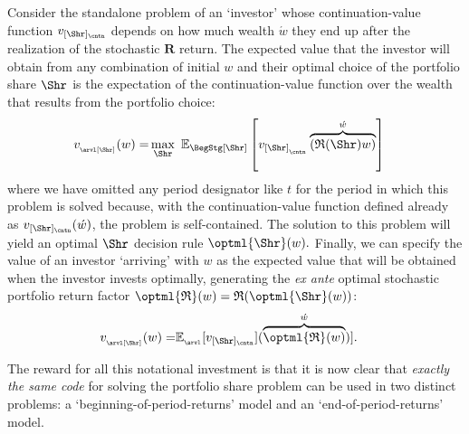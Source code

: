 \documentclass[titlepage, headings=optiontotocandhead]{Resources/texmf-local/tex/latex/econtex}
\begin{document}
Consider the standalone problem of an `investor' whose continuation-value function $v_{[\Shr]_\cntn}$ depends on how much wealth $\acute{w}$ they end up after the realization of the stochastic ${\mathbf{R}}$ return.  The expected value that the investor will obtain from any combination of initial $w$ and their optimal choice of the portfolio share $\Shr$ is the expectation of the continuation-value function over the wealth that results from the portfolio choice:
\begin{equation}\begin{gathered}\begin{aligned}
  v_{_\arvl[\Shr]}(w)  = & \max_{\Shr}~ {\mathbb{E}}_{\BegStg[\Shr]}\left[v_{[\Shr]_{_\cntn}}\overbrace{\left(\mathfrak{R}(\Shr){w}\right)}^{\acute{w}}\right] \label{eq:vMidStgShr}
    \end{aligned}\end{gathered}\end{equation}
where we have omitted any {period} designator like $t$ for the {period} in which this problem is solved because, with the continuation-value function defined already as $v_{[\Shr]_\cntn}(\acute{w})$, the problem is self-contained.  The solution to this problem will yield an optimal $\Shr$ decision rule $\optml{\Shr}(w).$  Finally, we can specify the value of an investor `arriving' with $w$ as the expected value that will be obtained when the investor invests optimally, generating the \textit{ex ante} optimal stochastic portfolio return factor $\optml{\mathfrak{R}}(w)=\mathfrak{R}(\optml{\Shr}(w))$:
\begin{equation}\begin{gathered}\begin{aligned}
      v_{_\arvl[\Shr]}(w)  = & {\mathbb{E}}_{_\arvl}[v_{[\Shr]_\cntn}](\overbrace{\optml{\mathfrak{R}}(w)}^{\acute{w}})].
\end{aligned}\end{gathered}\end{equation}

The reward for all this notational investment is that it is now clear that \emph{exactly the same code} for solving the portfolio share problem can be used in two distinct problems: a `beginning-of-period-returns' model and an `end-of-period-returns' model.

\hypertarget{beginning-returns}{}
\end{document}
